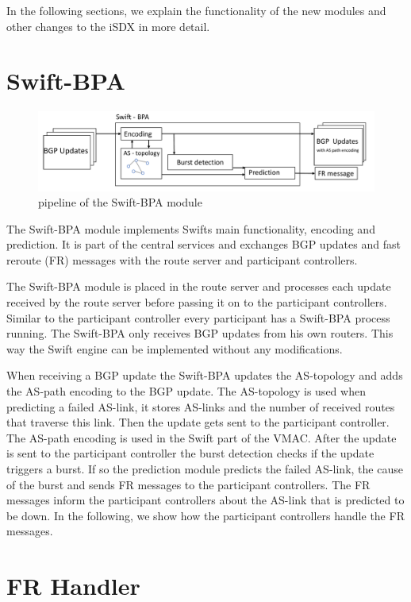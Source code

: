 In the following sections, we explain the functionality of the new modules and other changes to the iSDX in more detail.

\section{\label{chapter4:Swift-BPA}Swift-BPA}

\begin{figure}[h]
\center
\includegraphics[scale = 0.5]{Figures/design_swift_bpa_cropped.pdf}
\caption{pipeline of the Swift-BPA module}
\end{figure}

The Swift-BPA module implements Swifts main functionality, encoding and prediction. It is part of the central services and exchanges BGP updates and fast reroute (FR) messages with the route server and participant controllers.

The Swift-BPA module is placed in the route server and processes each update received by the route server before passing it on to the participant controllers. 
Similar to the participant controller every participant has a Swift-BPA process running. The Swift-BPA only receives BGP updates from his own routers. This way the Swift engine can be implemented without any modifications.

When receiving a BGP update the Swift-BPA updates the AS-topology and adds the AS-path encoding to the BGP update. The AS-topology is used when predicting a failed AS-link, it stores AS-links and the number of received routes that traverse this link. Then the update gets sent to the participant controller. The AS-path encoding is used in the Swift part of the VMAC. 
After the update is sent to the participant controller the burst detection checks if the update triggers a burst. If so the prediction module predicts the failed AS-link, the cause of the burst and sends FR messages to the participant controllers. 
The FR messages inform the participant controllers about the AS-link that is predicted to be down. In the following, we show how the participant controllers handle the FR messages.


\section{\label{chapter4:FR-handler}FR Handler}

